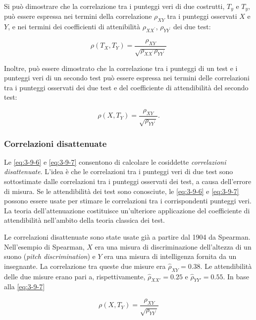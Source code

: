 \documentclass[
  11pt,
]{krantz}
\theoremstyle{definition}
\theoremstyle{definition}
\theoremstyle{definition}
\theoremstyle{definition}
\theoremstyle{remark}
\begin{document}
Si può dimostrare che la correlazione tra i punteggi veri di due costrutti, \(T_y\) e \(T_y\), può essere espressa nei termini della correlazione \(\rho_{XY}\) tra i punteggi osservati \(X\) e \(Y\), e nei termini dei coefficienti di attenibilità \(\rho_{XX^\prime}\), \(\rho_{YY^\prime}\) dei due test:

\begin{equation}
\rho(T_X, T_Y)  = \frac{\rho_{XY}}{\sqrt{\rho_{XX^\prime} \rho_{YY^\prime}}}
\label{eq:3-9-6}
\end{equation}

Inoltre, può essere dimostrato che la correlazione tra i punteggi di un test e i punteggi veri di un secondo test può essere espressa nei termini delle correlazioni tra i punteggi osservati dei due test e del coefficiente di attendibilità del secondo test:

\begin{equation}
\rho(X, T_Y)  = \frac{\rho_{XY}}{\sqrt{\rho_{YY^\prime}}}.
\label{eq:3-9-7}
\end{equation}

\hypertarget{correlazioni-disattenuate}{%
\subsubsection{Correlazioni disattenuate}\label{correlazioni-disattenuate}}

Le \eqref{eq:3-9-6} e \eqref{eq:3-9-7} consentono di calcolare le cosiddette \emph{correlazioni disattenuate}. L'idea è che le correlazioni tra i punteggi veri di due test sono sottostimate dalle correlazioni tra i punteggi osservati dei test, a causa dell'errore di misura. Se le attendibilità dei test sono conosciute, le \eqref{eq:3-9-6} e \eqref{eq:3-9-7} possono essere usate per stimare le correlazioni tra i corrispondenti punteggi veri. La teoria dell'attenuazione costituisce un'ulteriore applicazione del coefficiente di attendibilità nell'ambito della teoria classica dei test.

Le correlazioni disattenuate sono state usate già a partire dal 1904 da Spearman. Nell'esempio di Spearman, \(X\) era una misura di discriminazione dell'altezza di un suono (\emph{pitch discrimination}) e \(Y\) era una misura di intelligenza fornita da un insegnante. La correlazione tra queste due misure era \(\hat{\rho}_{XY}=0.38\). Le attendibilità delle due misure erano pari a, rispettivamente, \(\hat{\rho}_{XX'}= 0.25\) e \(\hat{\rho}_{YY'}= 0.55\). In base alla \eqref{eq:3-9-7}

\[
\rho(X, T_Y)  = \frac{\rho_{XY}}{\sqrt{\rho_{YY^\prime}}}
\]
\end{document}
